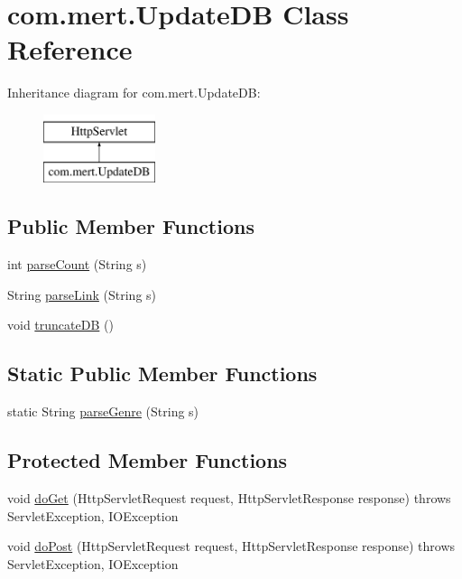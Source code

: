 \hypertarget{classcom_1_1mert_1_1_update_d_b}{}\section{com.\+mert.\+Update\+DB Class Reference}
\label{classcom_1_1mert_1_1_update_d_b}
Inheritance diagram for com.\+mert.\+Update\+DB\+:\begin{figure}[H]
\begin{center}
\leavevmode
\includegraphics[height=2.000000cm]{classcom_1_1mert_1_1_update_d_b}
\end{center}
\end{figure}
\subsection*{Public Member Functions}
\begin{DoxyCompactItemize}
\item 
int \hyperlink{classcom_1_1mert_1_1_update_d_b_abdd8ebc75cea7ddd5ec0e5209fe33aab}{parse\+Count} (String s)
\item 
String \hyperlink{classcom_1_1mert_1_1_update_d_b_abb3f580bac381c22f673cb8ea31cd98c}{parse\+Link} (String s)
\item 
void \hyperlink{classcom_1_1mert_1_1_update_d_b_ac0ad352f8b973b5d27acd72ad42f9028}{truncate\+DB} ()
\end{DoxyCompactItemize}
\subsection*{Static Public Member Functions}
\begin{DoxyCompactItemize}
\item 
static String \hyperlink{classcom_1_1mert_1_1_update_d_b_a318392aaae286a267a142550bdd78ca0}{parse\+Genre} (String s)
\end{DoxyCompactItemize}
\subsection*{Protected Member Functions}
\begin{DoxyCompactItemize}
\item 
void \hyperlink{classcom_1_1mert_1_1_update_d_b_abd05581f8da7d00b5d3cb2326f592dab}{do\+Get} (Http\+Servlet\+Request request, Http\+Servlet\+Response response)  throws Servlet\+Exception, I\+O\+Exception 
\item 
void \hyperlink{classcom_1_1mert_1_1_update_d_b_a8c87bdcc44be032b163f3d996d230585}{do\+Post} (Http\+Servlet\+Request request, Http\+Servlet\+Response response)  throws Servlet\+Exception, I\+O\+Exception 
\end{DoxyCompactItemize}


